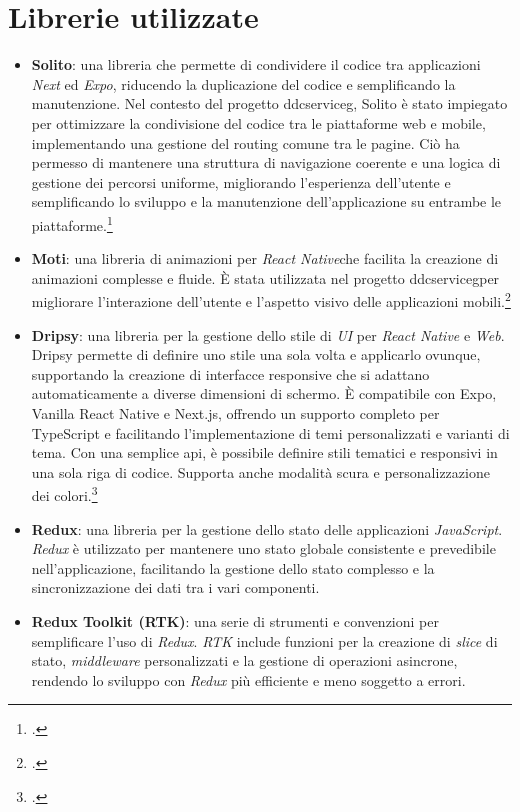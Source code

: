 \section{Librerie utilizzate}
\begin{itemize}
    \item \textbf{Solito}: una libreria che permette di condividere il codice tra applicazioni \textit{Next} ed \textit{Expo}, riducendo la duplicazione del codice e semplificando la manutenzione.
    Nel contesto del progetto \gls{ddcserviceg}\glox, Solito è stato impiegato per ottimizzare la condivisione del codice tra le piattaforme web e mobile, implementando una gestione del routing comune tra le pagine.
    Ciò ha permesso di mantenere una struttura di navigazione coerente e una logica di gestione dei percorsi uniforme, migliorando l'esperienza dell'utente e semplificando lo sviluppo e la manutenzione dell'applicazione su entrambe le piattaforme.\footcite{site:solito}
    \item \textbf{Moti}: una libreria di animazioni per \textit{React Native}\glox che facilita la creazione di animazioni complesse e fluide.
    È stata utilizzata nel progetto \gls{ddcserviceg}\glox per migliorare l'interazione dell'utente e l'aspetto visivo delle applicazioni mobili.\footcite{site:moti}
    \item \textbf{Dripsy}: una libreria per la gestione dello stile di \textit{UI} per \textit{React Native} e \textit{Web}.
    Dripsy permette di definire uno stile una sola volta e applicarlo ovunque, supportando la creazione di interfacce responsive che si adattano automaticamente a diverse dimensioni di schermo. È compatibile con Expo, Vanilla React Native e Next.js, offrendo un supporto completo per TypeScript e facilitando l'implementazione di temi personalizzati e varianti di tema. Con una semplice \gls{api}\glox, è possibile definire stili tematici e responsivi in una sola riga di codice. Supporta anche modalità scura e personalizzazione dei colori.\footcite{site:dripsy}
    \item \textbf{Redux}: una libreria per la gestione dello stato delle applicazioni \textit{JavaScript}.
    \textit{Redux} è utilizzato per mantenere uno stato globale consistente e prevedibile nell'applicazione, facilitando la gestione dello stato complesso e la sincronizzazione dei dati tra i vari componenti.
    \item \textbf{Redux Toolkit (RTK)}: una serie di strumenti e convenzioni per semplificare l'uso di \textit{Redux}. \textit{RTK} include funzioni per la creazione di \textit{slice} di stato, \textit{middleware} personalizzati e la gestione di operazioni asincrone, rendendo lo sviluppo con \textit{Redux} più efficiente e meno soggetto a errori.

\end{itemize}
